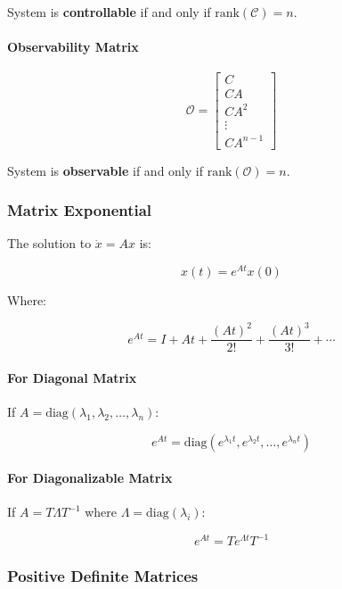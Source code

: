 \documentclass[11pt,a4paper]{book}
\begin{document}
System is \textbf{controllable} if and only if $\text{rank}(\mathcal{C}) = n$.

\paragraph{Observability Matrix}

\[\mathcal{O} = \begin{bmatrix} C \\ CA \\ CA^2 \\ \vdots \\ CA^{n-1} \end{bmatrix}\]

System is \textbf{observable} if and only if $\text{rank}(\mathcal{O}) = n$.

\medskip\noindent\hrulefill\medskip

\subsubsection{Matrix Exponential}

The solution to $\dot{x} = Ax$ is:

\[x(t) = e^{At} x(0)\]

Where:

\[e^{At} = I + At + \frac{(At)^2}{2!} + \frac{(At)^3}{3!} + \cdots\]

\paragraph{For Diagonal Matrix}

If $A = \text{diag}(\lambda_1, \lambda_2, \ldots, \lambda_n)$:

\[e^{At} = \text{diag}(e^{\lambda_1 t}, e^{\lambda_2 t}, \ldots, e^{\lambda_n t})\]

\paragraph{For Diagonalizable Matrix}

If $A = T \Lambda T^{-1}$ where $\Lambda = \text{diag}(\lambda_i)$:

\[e^{At} = T e^{\Lambda t} T^{-1}\]

\medskip\noindent\hrulefill\medskip

\subsubsection{Positive Definite Matrices}
\end{document}

